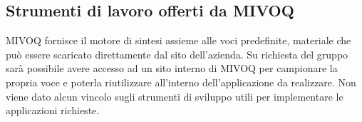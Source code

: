 \subsection{Strumenti di lavoro offerti da MIVOQ}
MIVOQ fornisce il motore di sintesi assieme alle voci predefinite, materiale
che può essere scaricato direttamente dal sito dell'azienda. Su richiesta del 
gruppo sarà possibile avere accesso ad un sito interno di MIVOQ per 
campionare la propria voce e poterla riutilizzare all'interno dell'applicazione 
da realizzare. Non viene dato alcun vincolo sugli strumenti di sviluppo utili per 
implementare le applicazioni richieste.

\newpage

